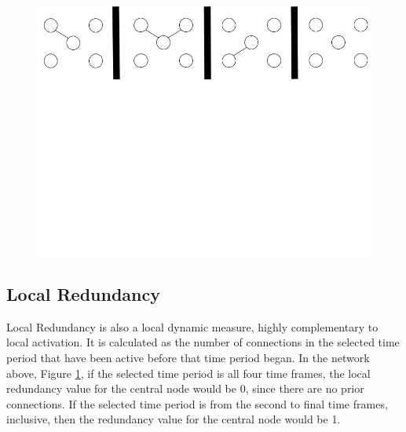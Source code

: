 \begin{figure}[h!]
  \begin{center}
  \includegraphics[trim={0 15cm 0 -1cm}, width=120mm]{./Figures/localActivation1.jpg}
  \end{center}
  \caption{}{}
  \label{localActivation1}
\end{figure}




\subsection{Local Redundancy}

Local Redundancy is also a local dynamic measure, highly complementary to local activation. It is calculated as the number of connections in the selected time period that have been active before that time period began. In the network above, Figure \ref{localActivation1}, if the selected time period is all four time frames, the local redundancy value for the central node would be 0, since there are no prior connections. If the selected time period is from the second to final time frames, inclusive, then the redundancy value for the central node would be 1.

